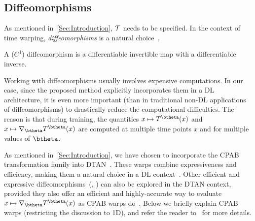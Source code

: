 \subsection{Diffeomorphisms}\label{cpab}
 As mentioned in~\autoref{Sec:Introduction}, $\mathcal{T}$ needs to be specified. 
In the context of time warping, \emph{diffeomorphisms} is a natural choice~\cite{Mumford:Book:2010:PT}.
  \begin{Definition}
 A ($C^1$) diffeomorphism is a differentiable invertible map with a differentiable inverse. 
  \end{Definition}
 Working with diffeomorphisms usually involves expensive computations.
 In our case, since the proposed method explicitly incorporates them 
in a DL architecture, it is even more important (than in traditional non-DL applications
of diffeomorphisms) to drastically reduce the computational difficulties. 
The reason is that during training, the quantities
$x\mapsto T^\btheta(x)$ and $x\mapsto \nabla_\btheta T^\btheta( x)$
are computed at multiple time points $x$ and for multiple values of $\btheta$. 

As mentioned in~\autoref{Sec:Introduction}, we have chosen to incorporate the CPAB transformation family into DTAN~\cite{Shapira:NIPS:2019:DTAN,Shapira:ICML:2023:RFDTAN}. These warps combine expressiveness and efficiency, making them a natural choice in a DL context~\cite{Hauberg:AISTATS:2016:DA,Skafte:CVPR:2018:DDTN}. 
Other efficient and expressive diffeomorphisms~(\eg, \cite{Zhang:IJCV:2018:fast,Arsigny:BIR:2006,Durrleman:IJCV:2013,Allassonniere:SIAM:2015})
can also be explored in the DTAN context, provided they also offer
an efficient and highly-accurate way to evaluate $x\mapsto\nabla_\btheta T^\btheta( x)$
as CPAB warps do~\cite{Freifeld:TR_CPAB_Derivaitive:2017}.
%
Below we briefly explain CPAB warps (restricting the discussion to 1D), and refer the reader to~\cite{Freifeld:ICCV:2015:CPAB,Freifeld:PAMI:2017:CPAB,Freifeld:TR_CPAB_Derivaitive:2017}
for more details. 

